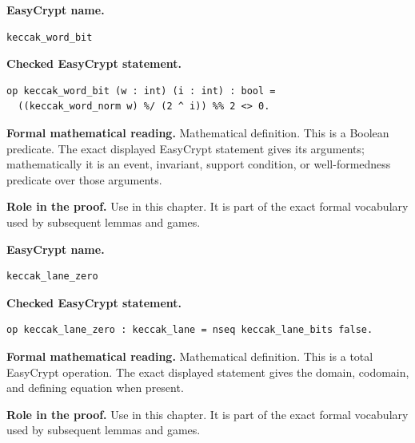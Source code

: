 \begin{formaldefinition}
\noindent\textbf{EasyCrypt name.}
\begin{lstlisting}[language=EasyCrypt,basicstyle=\ttfamily\scriptsize]
keccak_word_bit
\end{lstlisting}
\noindent\textbf{Checked EasyCrypt statement.}
\begin{lstlisting}[language=EasyCrypt,basicstyle=\ttfamily\scriptsize]
op keccak_word_bit (w : int) (i : int) : bool =
  ((keccak_word_norm w) %/ (2 ^ i)) %% 2 <> 0.
\end{lstlisting}
\noindent\textbf{Formal mathematical reading.}
Mathematical definition. This is a Boolean predicate.  The exact displayed EasyCrypt statement gives its arguments; mathematically it is an event, invariant, support condition, or well-formedness predicate over those arguments.

\noindent\textbf{Role in the proof.}
Use in this chapter. It is part of the exact formal vocabulary used by subsequent lemmas and games.

\end{formaldefinition}

\begin{formaldefinition}
\noindent\textbf{EasyCrypt name.}
\begin{lstlisting}[language=EasyCrypt,basicstyle=\ttfamily\scriptsize]
keccak_lane_zero
\end{lstlisting}
\noindent\textbf{Checked EasyCrypt statement.}
\begin{lstlisting}[language=EasyCrypt,basicstyle=\ttfamily\scriptsize]
op keccak_lane_zero : keccak_lane = nseq keccak_lane_bits false.
\end{lstlisting}
\noindent\textbf{Formal mathematical reading.}
Mathematical definition. This is a total EasyCrypt operation.  The exact displayed statement gives the domain, codomain, and defining equation when present.

\noindent\textbf{Role in the proof.}
Use in this chapter. It is part of the exact formal vocabulary used by subsequent lemmas and games.

\end{formaldefinition}

